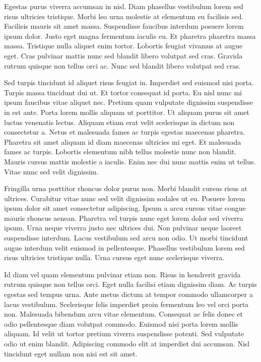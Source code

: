 \documentclass[11pt,a4paper]{article}
\begin{document}
Egestas purus viverra accumsan in nisl. Diam phasellus vestibulum lorem sed risus ultricies tristique. Morbi leo urna molestie at elementum eu facilisis sed. Facilisis mauris sit amet massa. Suspendisse faucibus interdum posuere lorem ipsum dolor. Justo eget magna fermentum iaculis eu. Et pharetra pharetra massa massa. Tristique nulla aliquet enim tortor. Lobortis feugiat vivamus at augue eget. Cras pulvinar mattis nunc sed blandit libero volutpat sed cras. Gravida rutrum quisque non tellus orci ac. Nunc sed blandit libero volutpat sed cras.

Sed turpis tincidunt id aliquet risus feugiat in. Imperdiet sed euismod nisi porta. Turpis massa tincidunt dui ut. Et tortor consequat id porta. Eu nisl nunc mi ipsum faucibus vitae aliquet nec. Pretium quam vulputate dignissim suspendisse in est ante. Porta lorem mollis aliquam ut porttitor. Ut aliquam purus sit amet luctus venenatis lectus. Aliquam etiam erat velit scelerisque in dictum non consectetur a. Netus et malesuada fames ac turpis egestas maecenas pharetra. Pharetra sit amet aliquam id diam maecenas ultricies mi eget. Et malesuada fames ac turpis. Lobortis elementum nibh tellus molestie nunc non blandit. Mauris cursus mattis molestie a iaculis. Enim nec dui nunc mattis enim ut tellus. Vitae nunc sed velit dignissim.

Fringilla urna porttitor rhoncus dolor purus non. Morbi blandit cursus risus at ultrices. Curabitur vitae nunc sed velit dignissim sodales ut eu. Posuere lorem ipsum dolor sit amet consectetur adipiscing. Ipsum a arcu cursus vitae congue mauris rhoncus aenean. Pharetra vel turpis nunc eget lorem dolor sed viverra ipsum. Urna neque viverra justo nec ultrices dui. Non pulvinar neque laoreet suspendisse interdum. Lacus vestibulum sed arcu non odio. Ut morbi tincidunt augue interdum velit euismod in pellentesque. Phasellus vestibulum lorem sed risus ultricies tristique nulla. Urna cursus eget nunc scelerisque viverra.

Id diam vel quam elementum pulvinar etiam non. Risus in hendrerit gravida rutrum quisque non tellus orci. Eget nulla facilisi etiam dignissim diam. Ac turpis egestas sed tempus urna. Ante metus dictum at tempor commodo ullamcorper a lacus vestibulum. Scelerisque felis imperdiet proin fermentum leo vel orci porta non. Malesuada bibendum arcu vitae elementum. Consequat ac felis donec et odio pellentesque diam volutpat commodo. Euismod nisi porta lorem mollis aliquam. Id velit ut tortor pretium viverra suspendisse potenti. Sed vulputate odio ut enim blandit. Adipiscing commodo elit at imperdiet dui accumsan. Nisl tincidunt eget nullam non nisi est sit amet.
\end{document}
